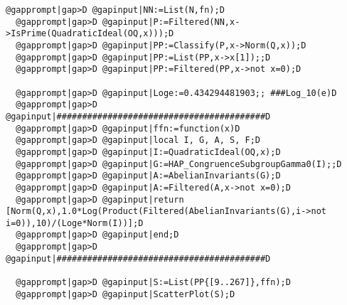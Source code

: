 \documentclass[a4paper,11pt]{report}
\begin{document}
{{\begin{Verbatim}[commandchars=@|D,fontsize=\small,frame=single,label=Example]
  @gapprompt|gap>D @gapinput|NN:=List(N,fn);D
  @gapprompt|gap>D @gapinput|P:=Filtered(NN,x->IsPrime(QuadraticIdeal(OQ,x)));D
  @gapprompt|gap>D @gapinput|PP:=Classify(P,x->Norm(Q,x));D
  @gapprompt|gap>D @gapinput|PP:=List(PP,x->x[1]);;D
  @gapprompt|gap>D @gapinput|PP:=Filtered(PP,x->not x=0);D
  
  @gapprompt|gap>D @gapinput|Loge:=0.434294481903;; ###Log_10(e)D
  @gapprompt|gap>D @gapinput|#########################################D
  @gapprompt|gap>D @gapinput|ffn:=function(x)D
  @gapprompt|gap>D @gapinput|local I, G, A, S, F;D
  @gapprompt|gap>D @gapinput|I:=QuadraticIdeal(OQ,x);D
  @gapprompt|gap>D @gapinput|G:=HAP_CongruenceSubgroupGamma0(I);;D
  @gapprompt|gap>D @gapinput|A:=AbelianInvariants(G);D
  @gapprompt|gap>D @gapinput|A:=Filtered(A,x->not x=0);D
  @gapprompt|gap>D @gapinput|return [Norm(Q,x),1.0*Log(Product(Filtered(AbelianInvariants(G),i->not i=0)),10)/(Loge*Norm(I))];D
  @gapprompt|gap>D @gapinput|end;D
  @gapprompt|gap>D @gapinput|#########################################D
  
  @gapprompt|gap>D @gapinput|S:=List(PP{[9..267]},ffn);D
  @gapprompt|gap>D @gapinput|ScatterPlot(S);D
  
\end{Verbatim}
  }

 }

 
\end{document}

